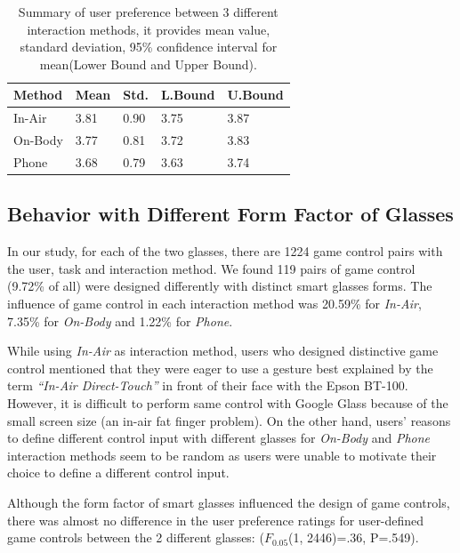 \documentclass{sigchi}
\newcommand\tabhead[1]{\small\textbf{#1}}
\begin{document}
  \begin{table}
    \centering
    \begin{tabular}{|l|l|l|l|l|}
      \hline
      \tabhead{Method} &
      \multicolumn{1}{|p{0.13\columnwidth}|}{\centering\tabhead{Mean}} &
      \multicolumn{1}{|p{0.13\columnwidth}|}{\centering\tabhead{Std.}} &
      \multicolumn{1}{|p{0.13\columnwidth}|}{\centering\tabhead{L.Bound}} &
      \multicolumn{1}{|p{0.13\columnwidth}|}{\centering\tabhead{U.Bound}} \\
      \hline
      In-Air & 3.81 & 0.90 & 3.75 & 3.87\\
      \hline
      On-Body & 3.77 & 0.81 & 3.72 & 3.83\\
      \hline
      Phone & 3.68 & 0.79 & 3.63 & 3.74\\
      \hline

    \end{tabular}
    \caption{Summary of user preference between 3 different interaction methods, it provides mean value, standard deviation, 95\% confidence interval for mean(Lower Bound and Upper Bound).}
    \label{tab:tablePreferenceInteractionMethod}
  \end{table}

  \subsection{Behavior with Different Form Factor of Glasses}
  In our study, for each of the two glasses, there are 1224 game control pairs with the user, task and interaction method. We found 119 pairs of game control (9.72\% of all) were designed differently with distinct smart glasses forms. The influence of game control in each interaction method was 20.59\% for \emph{In-Air}, 7.35\% for \emph{On-Body} and 1.22\% for \emph{Phone}. 

  While using \emph{In-Air} as interaction method, users who designed distinctive game control mentioned that they were eager to use a gesture best explained by the term \emph{``In-Air Direct-Touch''} in front of their face with the Epson BT-100. However, it is difficult to perform same control with Google Glass because of the small screen size (an in-air fat finger problem). On the other hand, users' reasons to define different control input with different glasses for \emph{On-Body} and \emph{Phone} interaction methods seem to be random as users were unable to motivate their choice to define a different control input.

  Although the form factor of smart glasses influenced the design of game controls, there was almost no difference in the user preference ratings for user-defined game controls between the 2 different glasses: ($F_{0.05}$(1, 2446)=.36, P=.549).
\end{document}
